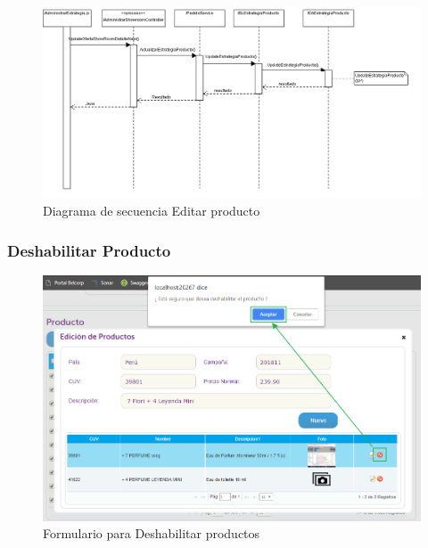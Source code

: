 \documentclass[a4paper,11pt]{paper}
\begin{document}
\begin{landscape}
\begin{figure}[!h]
\centering
\includegraphics[width=1.5\textwidth]{imgs/Producto/EditarProducto.png}
\caption{Diagrama de secuencia Editar producto}
\end{figure}
\end{landscape} 





\newpage
\subsubsection{Deshabilitar Producto}
\begin{figure}[h]
\centering
\includegraphics[width=1.0\textwidth]{imgs/Producto/FormularioDeshabilitarProducto.png}
\caption{Formulario para Deshabilitar productos}
\end{figure}
\end{document}
